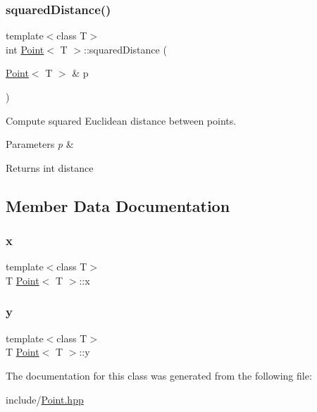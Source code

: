 \subsubsection{\texorpdfstring{squared\+Distance()}{squaredDistance()}}
{\footnotesize\ttfamily template$<$class T$>$ \\
int \mbox{\hyperlink{classPoint}{Point}}$<$ T $>$\+::squared\+Distance (\begin{DoxyParamCaption}\item[{\mbox{\hyperlink{classPoint}{Point}}$<$ T $>$ \&}]{p }\end{DoxyParamCaption})\hspace{0.3cm}{\ttfamily [inline]}}



Compute squared Euclidean distance between points. 


\begin{DoxyParams}{Parameters}
{\em p} & \\
\hline
\end{DoxyParams}
\begin{DoxyReturn}{Returns}
int distance 
\end{DoxyReturn}


\subsection{Member Data Documentation}
\mbox{\label{classPoint_a401d07562afaf0079121218025e66b76}} 
\subsubsection{\texorpdfstring{x}{x}}
{\footnotesize\ttfamily template$<$class T$>$ \\
T \mbox{\hyperlink{classPoint}{Point}}$<$ T $>$\+::x}

\mbox{\label{classPoint_a65146418a33ebb2cd9acb85cade60ac9}} 
\subsubsection{\texorpdfstring{y}{y}}
{\footnotesize\ttfamily template$<$class T$>$ \\
T \mbox{\hyperlink{classPoint}{Point}}$<$ T $>$\+::y}



The documentation for this class was generated from the following file\+:\begin{DoxyCompactItemize}
\item 
include/\mbox{\hyperlink{Point_8hpp}{Point.\+hpp}}\end{DoxyCompactItemize}
